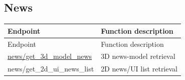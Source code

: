 \subsection{News}

\begin{longtable}{>{\ttfamily}p{}p{}}
\toprule
Endpoint & Function description \\
\midrule
\endfirsthead%

\toprule
Endpoint & Function description \\
\midrule
\endhead%


\hyperref[subsec:api_news_get_3d_model_news]
    {news/get\_3d\_model\_news}
    & 3D news-model retrieval \\

news/get\_2d\_ui\_news\_list
    & 2D news/UI list retrieval \\

\bottomrule
\end{longtable}

\newpage